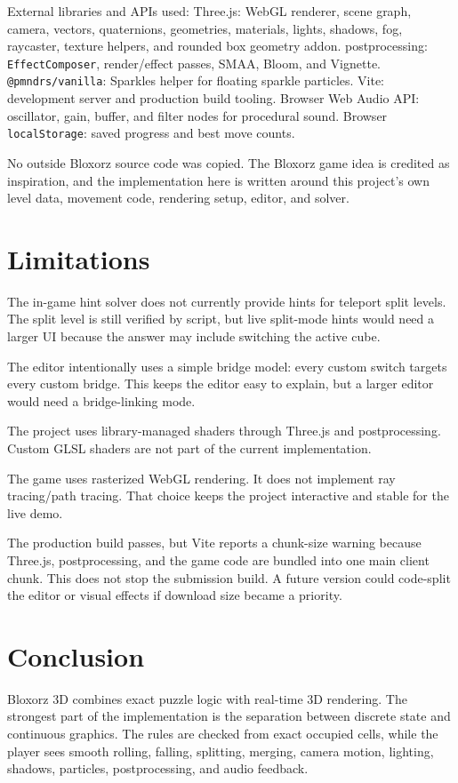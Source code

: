 \documentclass[11pt,a4paper]{article}
\newcommand{\code}[1]{\texttt{#1}}
\begin{document}
External libraries and APIs used:
Three.js: WebGL renderer, scene graph, camera, vectors, quaternions, geometries, materials, lights, shadows, fog, raycaster, texture helpers, and rounded box geometry addon.
postprocessing: \code{EffectComposer}, render/effect passes, SMAA, Bloom, and Vignette.
\code{@pmndrs/vanilla}: Sparkles helper for floating sparkle particles.
Vite: development server and production build tooling.
Browser Web Audio API: oscillator, gain, buffer, and filter nodes for procedural sound.
Browser \code{localStorage}: saved progress and best move counts.

No outside Bloxorz source code was copied. The Bloxorz game idea is credited as inspiration, and the implementation here is written around this project's own level data, movement code, rendering setup, editor, and solver.

\section{Limitations}

The in-game hint solver does not currently provide hints for teleport split levels. The split level is still verified by script, but live split-mode hints would need a larger UI because the answer may include switching the active cube.

The editor intentionally uses a simple bridge model: every custom switch targets every custom bridge. This keeps the editor easy to explain, but a larger editor would need a bridge-linking mode.

The project uses library-managed shaders through Three.js and postprocessing. Custom GLSL shaders are not part of the current implementation.

The game uses rasterized WebGL rendering. It does not implement ray tracing/path tracing. That choice keeps the project interactive and stable for the live demo.

The production build passes, but Vite reports a chunk-size warning because Three.js, postprocessing, and the game code are bundled into one main client chunk. This does not stop the submission build. A future version could code-split the editor or visual effects if download size became a priority.

\section{Conclusion}

Bloxorz 3D combines exact puzzle logic with real-time 3D rendering. The strongest part of the implementation is the separation between discrete state and continuous graphics. The rules are checked from exact occupied cells, while the player sees smooth rolling, falling, splitting, merging, camera motion, lighting, shadows, particles, postprocessing, and audio feedback.
\end{document}
